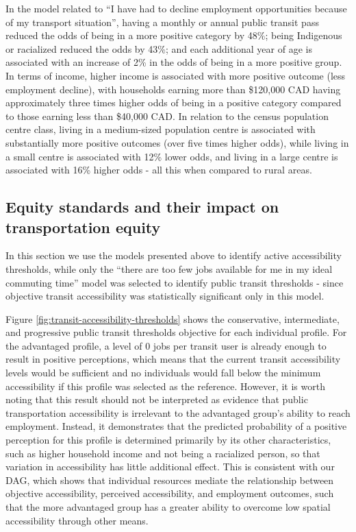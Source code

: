 \documentclass[preprint, 3p,
authoryear]{elsarticle} %
\begin{document}
In the model related to ``I have had to decline employment opportunities
because of my transport situation'', having a monthly or annual public
transit pass reduced the odds of being in a more positive category by
48\%; being Indigenous or racialized reduced the odds by 43\%; and each
additional year of age is associated with an increase of 2\% in the odds
of being in a more positive group. In terms of income, higher income is
associated with more positive outcome (less employment decline), with
households earning more than \$120,000 CAD having approximately three
times higher odds of being in a positive category compared to those
earning less than \$40,000 CAD. In relation to the census population
centre class, living in a medium-sized population centre is associated
with substantially more positive outcomes (over five times higher odds),
while living in a small centre is associated with 12\% lower odds, and
living in a large centre is associated with 16\% higher odds - all this
when compared to rural areas.

\subsection{Equity standards and their impact on transportation
equity}\label{equity-standards-and-their-impact-on-transportation-equity}

In this section we use the models presented above to identify active
accessibility thresholds, while only the ``there are too few jobs
available for me in my ideal commuting time'' model was selected to
identify public transit thresholds - since objective transit
accessibility was statistically significant only in this model.

Figure \ref{fig:transit-accessibility-thresholds} shows the
conservative, intermediate, and progressive public transit thresholds
objective for each individual profile. For the advantaged profile, a
level of 0 jobs per transit user is already enough to result in positive
perceptions, which means that the current transit accessibility levels
would be sufficient and no individuals would fall below the minimum
accessibility if this profile was selected as the reference. However, it
is worth noting that this result should not be interpreted as evidence
that public transportation accessibility is irrelevant to the advantaged
group's ability to reach employment. Instead, it demonstrates that the
predicted probability of a positive perception for this profile is
determined primarily by its other characteristics, such as higher
household income and not being a racialized person, so that variation in
accessibility has little additional effect. This is consistent with our
DAG, which shows that individual resources mediate the relationship
between objective accessibility, perceived accessibility, and employment
outcomes, such that the more advantaged group has a greater ability to
overcome low spatial accessibility through other means.
\end{document}
